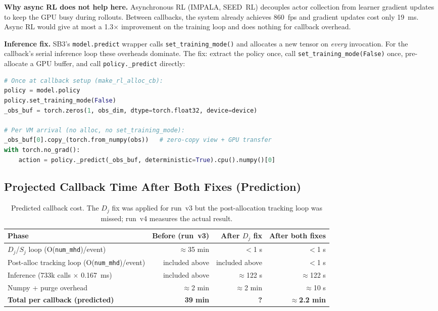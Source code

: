 \documentclass[11pt]{article}
\begin{document}
\noindent\textbf{Why async RL does not help here.}
Asynchronous RL (IMPALA, SEED~RL) decouples actor collection from learner
gradient updates to keep the GPU busy during rollouts.
Between callbacks, the system already achieves 860~fps and gradient updates
cost only 19~ms.  Async RL would give at most a 1.3$\times$ improvement
on the training loop and does nothing for callback overhead.

\textbf{Inference fix.} SB3's \texttt{model.predict} wrapper calls
\texttt{set\_training\_mode()} and allocates a new tensor on \textit{every}
invocation. For the callback's serial inference loop these overheads dominate.
The fix: extract the policy once, call \texttt{set\_training\_mode(False)}
once, pre-allocate a GPU buffer, and call \texttt{policy.\_predict} directly:

\begin{lstlisting}[language=Python]
# Once at callback setup (make_rl_alloc_cb):
policy = model.policy
policy.set_training_mode(False)
_obs_buf = torch.zeros(1, obs_dim, dtype=torch.float32, device=device)

# Per VM arrival (no alloc, no set_training_mode):
_obs_buf[0].copy_(torch.from_numpy(obs))   # zero-copy view + GPU transfer
with torch.no_grad():
    action = policy._predict(_obs_buf, deterministic=True).cpu().numpy()[0]
\end{lstlisting}

\subsection{Projected Callback Time After Both Fixes (Prediction)}

\begin{table}[h]
\centering
\begin{tabular}{lrrr}
\toprule
Phase & Before (run~v3) & After $D_j$ fix & After both fixes \\
\midrule
$D_j$/$S_j$ loop (O(\texttt{num\_mhd})/event) & $\approx$35 min & $<$1 s  & $<$1 s \\
Post-alloc tracking loop (O(\texttt{num\_mhd})/event) & included above & included above & $<$1 s \\
Inference (733k calls $\times$ 0.167~ms)               & included above & $\approx$122 s & $\approx$122 s \\
Numpy + purge overhead                                 & $\approx$2 min & $\approx$2 min & $\approx$10 s \\
\midrule
\textbf{Total per callback (predicted)} & \textbf{39 min} & \textbf{?} & \textbf{$\approx$2.2 min} \\
\bottomrule
\end{tabular}
\caption{Predicted callback cost. The $D_j$ fix was applied for run~v3 but the
post-allocation tracking loop was missed; run~v4 measures the actual result.}
\end{table}
\end{document}
